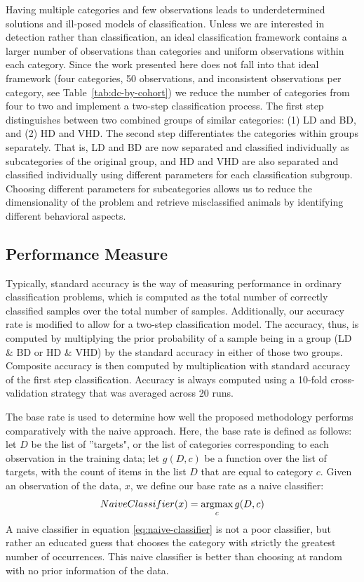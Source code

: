 	Having multiple categories and few observations leads to underdetermined solutions and ill-posed models of classification. Unless we are interested in detection rather than classification, an ideal classification framework contains a larger number of observations than categories and uniform observations within each category. Since the work presented here does not fall into that ideal framework (four categories, 50 observations, and inconsistent observations per category, see Table~\ref{tab:dc-by-cohort}) we reduce the number of categories from four to two and implement a two-step classification process. The first step distinguishes between two combined groups of similar categories: (1) LD and BD, and (2) HD and VHD. The second step differentiates the categories within groups separately. That is, LD and BD are now separated and classified individually as subcategories of the original group, and HD and VHD are also separated and classified individually using different parameters for each classification subgroup. Choosing different parameters for subcategories allows us to reduce the dimensionality of the problem and retrieve misclassified animals by identifying different behavioral aspects. 
	
	\subsection{Performance Measure \label{section:performance-measure}}
	Typically, standard accuracy is the way of measuring performance in ordinary classification problems, which is computed as the total number of correctly classified samples over the total number of samples. Additionally, our accuracy rate is modified to allow for a two-step classification model. The accuracy, thus, is computed by multiplying the prior probability of a sample being in a group (LD \& BD or HD \& VHD) by the standard accuracy in either of those two groups. Composite accuracy is then computed by multiplication with standard accuracy of the first step classification. Accuracy is always computed using a 10-fold cross-validation strategy that was averaged across 20 runs. 
	
	The base rate is used to determine how well the proposed methodology performs comparatively with the naive approach. Here, the base rate is defined as follows: let $D$ be the list of ''targets", or the list of categories corresponding to each observation in the training data; let $g(D,c)$ be a function over the list of targets, with the count of items in the list $D$ that are equal to category $c$. Given an observation of the data, $x$, we define our base rate as a naive classifier: 
	\begin{equation} 
	NaiveClassifier(x)= \argmax_{c}g(D, c) \label{eq:naive-classifier}
	\end{equation}
	A naive classifier in equation \ref{eq:naive-classifier} is not a poor classifier, but rather an educated guess that chooses the category with strictly the greatest number of occurrences. This naive classifier is better than choosing at random with no prior information of the data.


